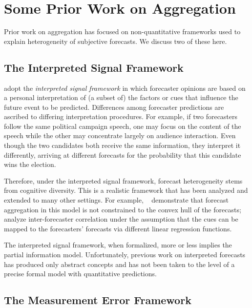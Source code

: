\documentclass[11pt]{article}
\theoremstyle{definition}
\theoremstyle{definition}
\begin{document}
\section{Some Prior Work on Aggregation}
\label{sec:prior}

Prior work on aggregation has focused on non-quantitative
frameworks used to explain heterogeneity of subjective forecasts.  
We discuss two of these here.

\subsection{The Interpreted Signal Framework}
\label{ss:inerpreted}

\citet{hong2009interpreted} adopt the {\em interpreted 
signal framework} in which forecaster opinions are based on a personal
interpretation of (a subset of) the factors or cues that influence
the future event to be predicted.  Differences among forecaster
predictions are ascribed to differing interpretation procedures.
For example, if two forecasters follow the same political campaign
speech, one may focus on the content of the speech while the other 
may concentrate largely on audience interaction.  Even though the
two candidates both receive the same information, they interpret
it differently, arriving at different forecasts for the probability
that this candidate wins the election.  

Therefore, under the interpreted signal framework, forecast heterogeneity 
stems from cognitive diversity.  This is a realistic framework that
has been analyzed and extended to many other settings.  For example,
~\citet{parunak2013characterizing} demonstrate that 
forecast aggregation in this model is not constrained to the convex 
hull of the forecasts;~\citet{broomell2009forecasters}
analyze inter-forecaster correlation
under the assumption that the cues can be mapped to the forecasters'
forecasts via different linear regression functions.

The interpreted signal framework, when formalized, more or less implies 
the partial information model.  Unfortunately, previous work on
interpreted forecasts has produced only abstract concepts and 
has not been taken to the level of a precise formal model with 
quantitative predictions.  

\subsection{The Measurement Error Framework}
\label{ss:measurement}
\end{document}
